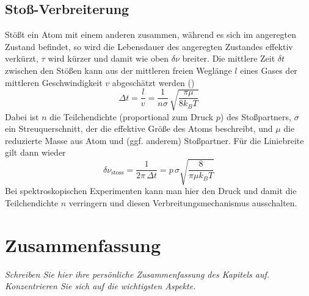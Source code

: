 \subsection{Stoß-Verbreiterung}

Stößt ein Atom mit einem anderen zusammen, während es sich im angeregten Zustand befindet, so wird die Lebensdauer des angeregten Zustandes effektiv verkürzt, $\tau$ wird kürzer und damit wie oben $\delta \nu$ breiter. Die mittlere Zeit $\delta t$ zwischen den Stößen kann aus der mittleren freien Weglänge $l$ eines Gases der mittleren Geschwindigkeit $v$ abgeschätzt werden (\cite{Demtroeder_laser}) %
\begin{equation}
    \Delta t = \frac{l}{v} = \frac{1}{n \sigma} \, \sqrt{ \frac{\pi \mu}{8 k_B T}}
\end{equation}
Dabei ist $n$ die Teilchendichte (proportional zum Druck $p$) des Stoßpartners, $\sigma$ ein Streuquerschnitt, der die effektive Größe des Atoms beschreibt, und $\mu$ die reduzierte  Masse aus Atom und (ggf. anderem) Stoßpartner. Für die Liniebreite gilt dann wieder
\begin{equation}
    \delta \nu_\text{stoss} = \frac{1}{2\pi \, \Delta t} = p \, \sigma \sqrt{ \frac{8}{\pi \mu k_B T}}
\end{equation}
Bei spektroskopischen Experimenten kann man hier den Druck und damit die Teilchendichte $n$ verringern und diesen Verbreitungsmechanismus ausschalten. 

\newpage


\section{Zusammenfassung}

\textit{Schreiben Sie hier ihre persönliche Zusammenfassung des Kapitels auf. Konzentrieren Sie sich auf die wichtigsten Aspekte.}

\vspace*{10cm}


\printbibliography[segment=\therefsegment,heading=subbibliography]
